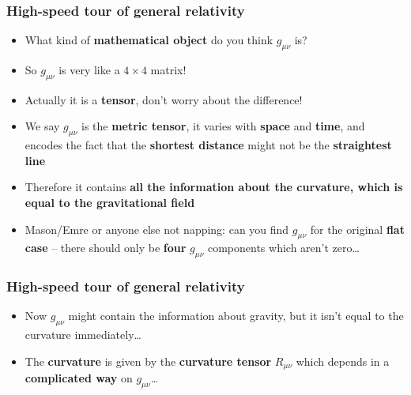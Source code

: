 \documentclass{beamer}
\begin{document}
\begin{frame}
  \frametitle{High-speed tour of general relativity}
  \begin{itemize}
    \item<1-> What kind of \textbf{mathematical object} do you think $g_{\mu\nu}$ is?
    \item<2-> So $g_{\mu\nu}$ is very like a $4\times 4$ matrix!
    \item<3-> Actually it is a \textbf{tensor}, don't worry about the difference!
    \item<4-> We say $g_{\mu\nu}$ is the \textbf{metric tensor}, it varies with \textbf{space} and \textbf{time}, and encodes the fact that the \textbf{shortest distance} might not be the \textbf{straightest line}
    \item<5-> Therefore it contains \textbf{all the information about the curvature, which is equal to the gravitational field}
    \item<6-> Mason/Emre or anyone else not napping: can you find $g_{\mu\nu}$ for the original \textbf{flat case} -- there should only be \textbf{four} $g_{\mu\nu}$ components which aren't zero\ldots
  \end{itemize}
\end{frame}

\begin{frame}
  \frametitle{High-speed tour of general relativity}
  \begin{itemize}
    \item<1-> Now $g_{\mu\nu}$ might contain the information about gravity, but it isn't equal to the curvature immediately\ldots
    \item<2-> The \textbf{curvature} is given by the \textbf{curvature tensor} $R_{\mu\nu}$ which depends in a \textbf{complicated way} on $g_{\mu\nu}$\ldots
  \end{itemize}
\end{frame}
\end{document}
